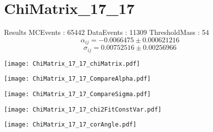 \documentclass[a4paper,12pt]{article}
\begin{document}
\section{ChiMatrix\_17\_17}
\begin{minipage}{0.49\linewidth} Results \newline
MCEvents : 65442\newline
DataEvents : 11309 \newline
ThresholdMass : 54\\
$$\alpha_{ij} = -0.0066475\pm 0.000621216$$
$$\sigma_{ij} = 0.00752516\pm 0.00256966$$
\end{minipage}\hfill
\begin{minipage}{0.49\linewidth} 
\texttt{[image: ChiMatrix\_17\_17\_chiMatrix.pdf]}\\
\end{minipage}
\hfill
\begin{minipage}{0.49\linewidth} 
\texttt{[image: ChiMatrix\_17\_17\_CompareAlpha.pdf]}\\
\end{minipage}
\hfill
\begin{minipage}{0.49\linewidth} 
\texttt{[image: ChiMatrix\_17\_17\_CompareSigma.pdf]}\\
\end{minipage}
\begin{minipage}{0.49\linewidth} 
\texttt{[image: ChiMatrix\_17\_17\_chi2FitConstVar.pdf]}\\
\end{minipage}
\hfill
\begin{minipage}{0.49\linewidth} 
\texttt{[image: ChiMatrix\_17\_17\_corAngle.pdf]}\\
\end{minipage}
\end{document}
